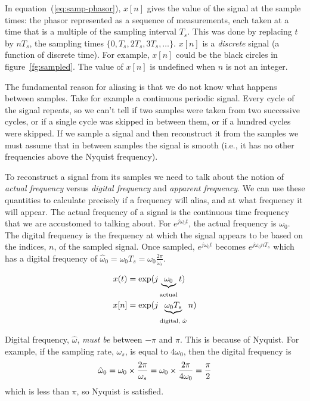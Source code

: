 In equation~(\ref{eq:samp-phasor}), $x[n]$ gives the value of the signal at the
sample times: the phasor represented as a sequence of measurements,
each taken at a time that is a multiple of the sampling interval
$T_s$. This was done by replacing $t$ by $nT_s$, the sampling times
$\{0, T_s, 2T_s, 3T_s, \ldots\}$. $x[n]$ is a \emph{discrete} signal
(a function of discrete time). For example, $x[n]$ could be the black circles in
figure~\ref{fg:sampled}. The value of $x[n]$ is undefined when $n$ is not an integer. 

The fundamental reason for aliasing is that we do not know what happens between samples. Take for example a continuous periodic signal. Every cycle of the signal repeats, so we can't tell if two
samples were taken from two successive cycles, or if a single cycle
was skipped in between them, or if a hundred cycles were
skipped. If we sample a signal and then reconstruct it from the samples we must assume that in between samples the signal is smooth (i.e., it has no other frequencies above the Nyquist frequency). 

To reconstruct a signal from its samples we need to talk about the notion of \emph{actual frequency} versus \emph{digital frequency} and \emph{apparent frequency}. We can use these quantities to calculate precisely if a frequency will alias, and at what frequency it will appear. The actual frequency of a signal is the continuous time frequency that we are accustomed to talking about. For  $e^{j\omega_0 t}$, the actual frequency is $\omega_0$. The digital frequency is the frequency at which the signal appears to be based on the indices, $n$, of the sampled signal. Once sampled, $ e^{j\omega_0 t}$ becomes $ e^{j\omega_0 nT_s}$ which has a digital frequency of $\hat{\omega}_0=\omega_0 T_s=\omega_0 \frac{2\pi}{\omega_s}$.  

\begin{align}
x(t) & = \exp(j\underbrace{\omega_0}_{\stackrel{}{\text{actual}}}t) \notag\\
x[n] & = \exp(j\underbrace{\omega_0 T_s}_{\stackrel{}{\text{digital, $\hat{\omega}$}}} n) \label{eq:samp-phasor-nyq}
\end{align}

Digital frequency, $\hat{\omega}$, \emph{must be} between $-\pi$ and $\pi$. This is because of Nyquist. For example, if the sampling rate, $\omega_s$, is equal to $4\omega_0$, then the digital frequency is
 \[
 \hat{\omega}_0=\omega_0 \times  \frac{2\pi}{\omega_s}=\omega_0\times \frac{2\pi}{4\omega_0}=\frac{\pi}{2} \notag 
 \]
which is less than $\pi$, so Nyquist is satisfied.

